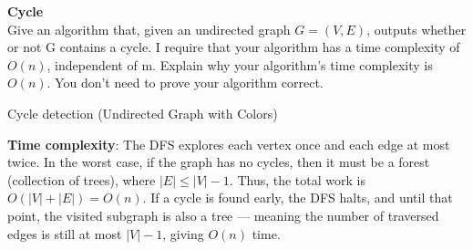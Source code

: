 \textbf{Cycle} \\
Give an algorithm that, given an undirected graph $G = (V, E)$, outputs whether or not G contains a
cycle. I require that your algorithm has a time complexity of $O(n)$, independent of m. Explain why
your algorithm's time complexity is $O(n)$. You don't need to prove your algorithm correct.

\begin{customsolutionbox}
    \begin{algorithm}[H]
        \caption{Cycle detection (Undirected Graph with Colors)}

    \end{algorithm}

    \textbf{Time complexity}: The DFS explores each vertex once and each edge at most twice. In the worst case, 
    if the graph has no cycles, then it must be a forest (collection of trees), where $|E| \leq |V| - 1$. 
    Thus, the total work is $O(|V| + |E|) = O(n)$. If a cycle is found early, the DFS halts, and until that point, 
    the visited subgraph is also a tree — meaning the number of traversed edges is still at most $|V| - 1$, 
    giving $O(n)$ time.
\end{customsolutionbox}

